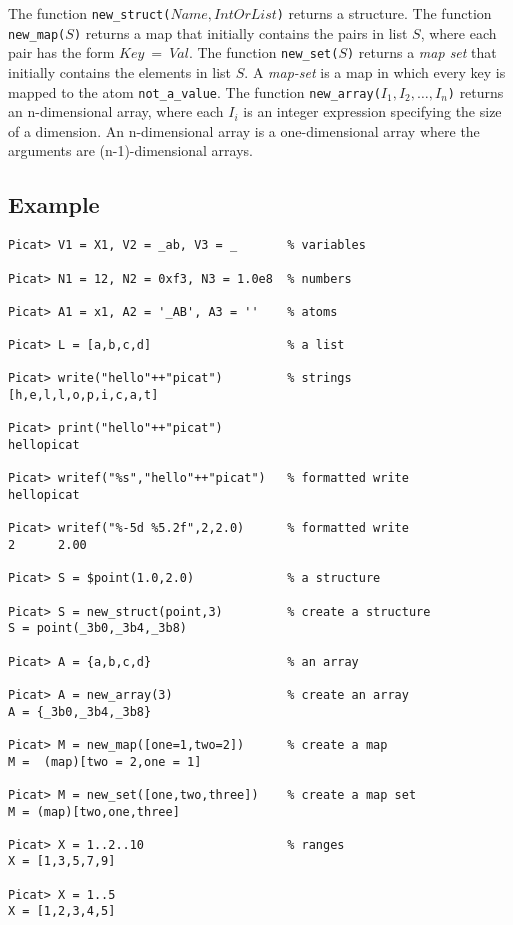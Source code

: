 The function \texttt{new\_struct($Name,IntOrList$)} returns a structure. The function \texttt{new\_map($S$)} returns a map that initially contains the pairs in list $S$, where each pair has the form $Key\ =\ Val$. The function \texttt{new\_set($S$)} returns a \emph{map set} that initially contains the elements in list $S$. A \emph{map-set}  is a map in which every key is mapped to the atom \texttt{not\_a\_value}. The function \texttt{new\_array($I_1,I_2,\ldots,I_{n}$)} returns an n-dimensional array, where each $I_i$ is an integer expression specifying the size of a dimension. An n-dimensional array is a one-dimensional array where the arguments are (n-1)-dimensional arrays. 

\subsection*{Example}
\begin{verbatim}
Picat> V1 = X1, V2 = _ab, V3 = _       % variables

Picat> N1 = 12, N2 = 0xf3, N3 = 1.0e8  % numbers

Picat> A1 = x1, A2 = '_AB', A3 = ''    % atoms

Picat> L = [a,b,c,d]                   % a list

Picat> write("hello"++"picat")         % strings
[h,e,l,l,o,p,i,c,a,t]

Picat> print("hello"++"picat")         
hellopicat

Picat> writef("%s","hello"++"picat")   % formatted write
hellopicat

Picat> writef("%-5d %5.2f",2,2.0)      % formatted write
2      2.00

Picat> S = $point(1.0,2.0)             % a structure

Picat> S = new_struct(point,3)         % create a structure   
S = point(_3b0,_3b4,_3b8)

Picat> A = {a,b,c,d}                   % an array

Picat> A = new_array(3)                % create an array
A = {_3b0,_3b4,_3b8}

Picat> M = new_map([one=1,two=2])      % create a map
M =  (map)[two = 2,one = 1]

Picat> M = new_set([one,two,three])    % create a map set
M = (map)[two,one,three]

Picat> X = 1..2..10                    % ranges
X = [1,3,5,7,9]

Picat> X = 1..5
X = [1,2,3,4,5]
\end{verbatim}

